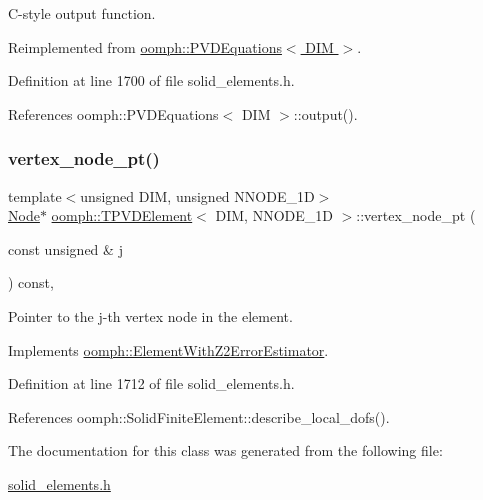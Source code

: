 C-\/style output function. 



Reimplemented from \hyperlink{classoomph_1_1PVDEquations_ac35042c495411ffc96501d6705b8fa7a}{oomph\+::\+P\+V\+D\+Equations$<$ D\+I\+M $>$}.



Definition at line 1700 of file solid\+\_\+elements.\+h.



References oomph\+::\+P\+V\+D\+Equations$<$ D\+I\+M $>$\+::output().

\mbox{\label{classoomph_1_1TPVDElement_a3251ad69f6f52975c923120e06487217}} 
\subsubsection{\texorpdfstring{vertex\+\_\+node\+\_\+pt()}{vertex\_node\_pt()}}
{\footnotesize\ttfamily template$<$unsigned D\+IM, unsigned N\+N\+O\+D\+E\+\_\+1D$>$ \\
\hyperlink{classoomph_1_1Node}{Node}$\ast$ \hyperlink{classoomph_1_1TPVDElement}{oomph\+::\+T\+P\+V\+D\+Element}$<$ D\+IM, N\+N\+O\+D\+E\+\_\+1D $>$\+::vertex\+\_\+node\+\_\+pt (\begin{DoxyParamCaption}\item[{const unsigned \&}]{j }\end{DoxyParamCaption}) const\hspace{0.3cm}{\ttfamily [inline]}, {\ttfamily [virtual]}}



Pointer to the j-\/th vertex node in the element. 



Implements \hyperlink{classoomph_1_1ElementWithZ2ErrorEstimator_a0eedccc33519f852c5dc2055ddf2774b}{oomph\+::\+Element\+With\+Z2\+Error\+Estimator}.



Definition at line 1712 of file solid\+\_\+elements.\+h.



References oomph\+::\+Solid\+Finite\+Element\+::describe\+\_\+local\+\_\+dofs().



The documentation for this class was generated from the following file\+:\begin{DoxyCompactItemize}
\item 
\hyperlink{solid__elements_8h}{solid\+\_\+elements.\+h}\end{DoxyCompactItemize}
